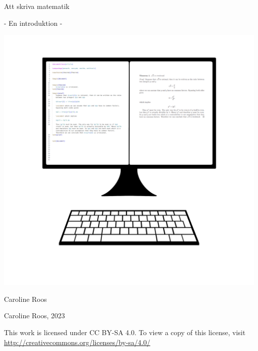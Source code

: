 \documentclass[titlepage]{article}
\begin{document}
\begin{titlepage}
\begin{center}
    \Huge Att skriva matematik 
    \vspace{2mm}

    \noindent \Large - En introduktion -

    \vfill

    \includegraphics[width = .8\linewidth]{frontv2.png}
    \vfill

    \large
    Caroline Roos

\end{center}    
\end{titlepage}


\tableofcontents

\vfill

\noindent  Caroline Roos, 2023

\vspace{3mm}


\noindent This work is licensed under CC BY-SA 4.0. To view a copy of this license, visit \url{http://creativecommons.org/licenses/by-sa/4.0/}






\thispagestyle{empty}


\newpage
\setcounter{page}{1}



\end{document}
